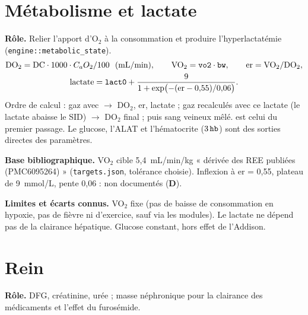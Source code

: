 \documentclass[10pt,a4paper]{article}
\newcommand{\cmd}[1]{\texttt{#1}}
\newcommand{\vp}[1]{\text{\texttt{\detokenize{#1}}}}
\newcommand{\evD}{\textcolor{red!70!black}{\textbf{D}}}
\newcommand{\limite}[1]{\par\textbf{Limites et écarts connus.} #1}
\newcommand{\sources}[1]{\par\textbf{Base bibliographique.} #1}
\begin{document}
\section{Métabolisme et lactate}\label{sec:metab}

\textbf{Rôle.} Relier l'apport d'O$_2$ à la consommation et produire l'hyperlactatémie (\cmd{engine::metabolic\_state}).
\begin{gather}
\text{DO}_2 = \text{DC}\cdot 1000\cdot C_aO_2/100\ \ (\text{mL/min}),\qquad \text{VO}_2 = \vp{vo2}\cdot\vp{bw},\qquad \text{er} = \text{VO}_2/\text{DO}_2,\\
\text{lactate} = \vp{lact0} + \frac{9}{1 + \exp\bigl(-(\text{er} - 0{,}55)/0{,}06\bigr)}.
\end{gather}
Ordre de calcul : gaz avec \vp{lact0} $\to$ DO$_2$, er, lactate ; gaz recalculés avec ce lactate (le lactate abaisse le SID) $\to$ DO$_2$ final ; puis sang veineux mêlé. \vp{er} est celui du premier passage. Le glucose, l'ALAT et l'hématocrite ($3\,\vp{hb}$) sont des sorties directes des paramètres.

\sources{VO$_2$ cible 5,4~mL/min/kg « dérivée des REE publiées (PMC6095264) » (\cmd{targets.json}, tolérance choisie). Inflexion à er = 0,55, plateau de 9~mmol/L, pente 0,06 : non documentés (\evD{}).}

\limite{VO$_2$ fixe (pas de baisse de consommation en hypoxie, pas de fièvre ni d'exercice, sauf via les modules). Le lactate ne dépend pas de la clairance hépatique. Glucose constant, hors effet de l'Addison.}

\section{Rein}\label{sec:rein}

\textbf{Rôle.} DFG, créatinine, urée ; masse néphronique pour la clairance des médicaments et l'effet du furosémide.
\end{document}
